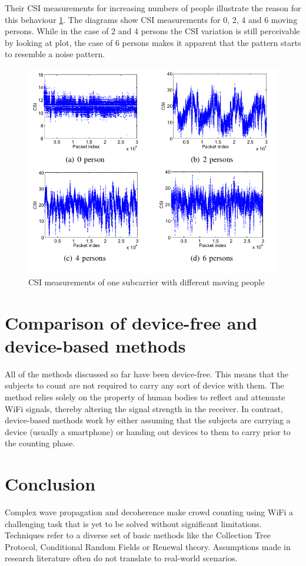 \documentclass[conference]{IEEEtran}
\begin{document}
Their CSI measurements for increasing numbers of people illustrate the reason for this behaviour \ref{figFrogeyeCsiVariation}. The diagrams show CSI measurements for 0, 2, 4 and 6 moving persons. While in the case of 2 and 4 persons the CSI variation is still perceivable by looking at plot, the case of 6 persons makes it apparent that the pattern starts to resemble a noise pattern.
\begin{figure}[htbp]
\centerline{\includegraphics[scale=0.4]{figFrogeyeCsiVariation.png}}
\caption{CSI measurements of one subcarrier with different moving people \cite{Xi}}
\label{figFrogeyeCsiVariation}
\end{figure}

\section{Comparison of device-free and device-based methods}
All of the methods discussed so far have been device-free. This means that the subjects to count are not required to carry any sort of device with them. The method relies solely on the property of human bodies to reflect and attenuate WiFi signals, thereby altering the signal strength in the receiver. In contrast, device-based methods work by either assuming that the subjects are carrying a device (usually a smartphone) or handing out devices to them to carry prior to the counting phase.
\par


\section{Conclusion}
Complex wave propagation and decoherence make crowd counting using WiFi a challenging task that is yet to be solved without significant limitations. Techniques refer to a diverse set of basic methods like the Collection Tree Protocol, Conditional Random Fields or Renewal theory. Assumptions made in research literature often do not translate to real-world scenarios.
\end{document}
